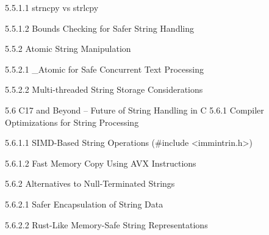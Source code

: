 5.5.1.1 strncpy vs strlcpy

5.5.1.2 Bounds Checking for Safer String Handling

5.5.2 Atomic String Manipulation

5.5.2.1 _Atomic for Safe Concurrent Text Processing

5.5.2.2 Multi-threaded String Storage Considerations

5.6 C17 and Beyond – Future of String Handling in C
5.6.1 Compiler Optimizations for String Processing

5.6.1.1 SIMD-Based String Operations (#include <immintrin.h>)

5.6.1.2 Fast Memory Copy Using AVX Instructions

5.6.2 Alternatives to Null-Terminated Strings

5.6.2.1 Safer Encapsulation of String Data

5.6.2.2 Rust-Like Memory-Safe String Representations

